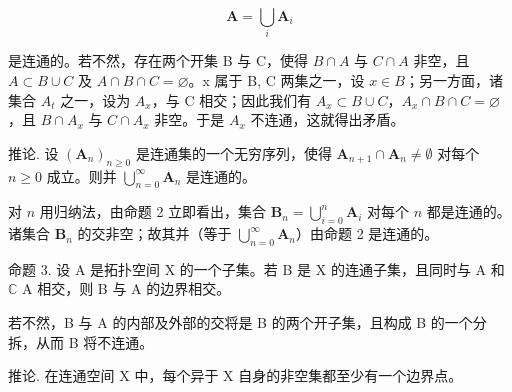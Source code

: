 \[
\mathbf {A} = \bigcup_ {i} \mathbf {A} _ {i}
\]

是连通的。若不然，存在两个开集 B 与 C，使得 \(B \cap A\) 与 \(C \cap A\) 非空，且 \(A \subset B \cup C\) 及 \(A \cap B \cap C = \varnothing\)。x 属于 B, C 两集之一，设 \(x \in B\)；另一方面，诸集合 \(A_t\) 之一，设为 \(A_x\)，与 C 相交；因此我们有 \(A_x \subset B \cup C\)，\(A_x \cap B \cap C = \varnothing\)，且 \(B \cap A_x\) 与 \(C \cap A_x\) 非空。于是 \(A_x\) 不连通，这就得出矛盾。

推论. 设 \((\mathbf{A}_n)_{n\geqslant 0}\) 是连通集的一个无穷序列，使得 \(\mathbf{A}_{n + 1}\cap \mathbf{A}_n\neq \emptyset\) 对每个 \(n\geqslant 0\) 成立。则并 \(\bigcup_{n = 0}^{\infty}\mathbf{A}_n\) 是连通的。

对 \(n\) 用归纳法，由命题 2 立即看出，集合 \(\mathbf{B}_n = \bigcup_{i=0}^n \mathbf{A}_i\) 对每个 \(n\) 都是连通的。诸集合 \(\mathbf{B}_n\) 的交非空；故其并（等于 \(\bigcup_{n=0}^{\infty} \mathbf{A}_n\)）由命题 2 是连通的。

命题 3. 设 A 是拓扑空间 X 的一个子集。若 B 是 X 的连通子集，且同时与 A 和 \(\mathbb{C}\) A 相交，则 B 与 A 的边界相交。

若不然，B 与 A 的内部及外部的交将是 B 的两个开子集，且构成 B 的一个分拆，从而 B 将不连通。

推论. 在连通空间 X 中，每个异于 X 自身的非空集都至少有一个边界点。

